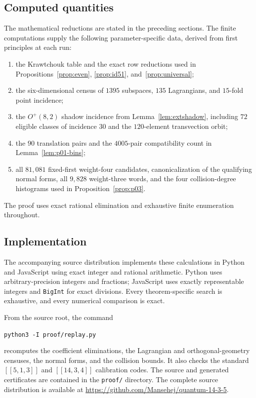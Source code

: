 \documentclass[11pt]{amsart}
\theoremstyle{definition}
\theoremstyle{remark}
\newcommand{\code}[1]{[\![#1]\!]}
\begin{document}
\subsection{Computed quantities}
The mathematical reductions are stated in the preceding sections.  The
finite computations supply the following parameter-specific data, derived
from first principles at each run:
\begin{enumerate}
\item the Krawtchouk table and the exact row reductions used in
Propositions~\ref{prop:even}, \ref{prop:id51}, and~\ref{prop:universal};
\item the six-dimensional census of $1395$ subspaces, $135$ Lagrangians, and
$15$-fold point incidence;
\item the $O^+(8,2)$ shadow incidence from Lemma~\ref{lem:extshadow}, including
$72$ eligible classes of incidence $30$ and the $120$-element transvection
orbit;
\item the $90$ translation pairs and the $4005$-pair compatibility count in
Lemma~\ref{lem:p01-bins};
\item all $81{,}081$ fixed-first weight-four candidates, canonicalization of
the qualifying normal forms, all $9{,}828$ weight-three words, and the four
collision-degree histograms used in Proposition~\ref{prop:p03}.
\end{enumerate}
The proof uses exact rational elimination and exhaustive finite enumeration
throughout.

\subsection{Implementation}
The accompanying source distribution implements these calculations in Python
and JavaScript using exact integer and rational arithmetic.  Python uses
arbitrary-precision integers and fractions; JavaScript uses exactly
representable integers and \texttt{BigInt} for exact divisions.  Every
theorem-specific search is exhaustive, and every numerical comparison is exact.

From the source root, the command
\begin{center}
\texttt{python3 -I proof/replay.py}
\end{center}
recomputes the coefficient eliminations, the Lagrangian and
orthogonal-geometry censuses, the normal forms, and the collision bounds.  It
also checks the standard $\code{5,1,3}$ and $\code{14,3,4}$ calibration codes.
The source and generated certificates are contained in the \texttt{proof/}
directory.  The complete source distribution is available at
\url{https://github.com/Mansehej/quantum-14-3-5}.
\end{document}
